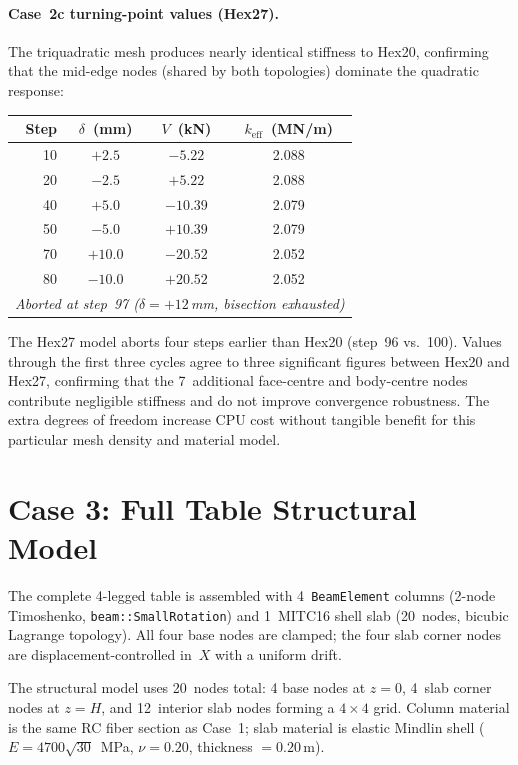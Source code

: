 \paragraph{Case~2c turning-point values (Hex27).}
The triquadratic mesh produces nearly identical stiffness to Hex20,
confirming that the mid-edge nodes (shared by both topologies)
dominate the quadratic response:

\begin{center}
\begin{tabular}{rccc}
\toprule
\textbf{Step} & $\delta$~(mm) & $V$~(kN) & $k_{\text{eff}}$~(MN/m) \\
\midrule
 10 & $+2.5$  & $-5.22$  & 2.088 \\
 20 & $-2.5$  & $+5.22$  & 2.088 \\
 40 & $+5.0$  & $-10.39$ & 2.079 \\
 50 & $-5.0$  & $+10.39$ & 2.079 \\
 70 & $+10.0$ & $-20.52$ & 2.052 \\
 80 & $-10.0$ & $+20.52$ & 2.052 \\
\multicolumn{4}{c}{\textit{Aborted at step~97
  ($\delta = +12$\,mm, bisection exhausted)}} \\
\bottomrule
\end{tabular}
\end{center}

\noindent
The Hex27 model aborts four steps earlier than Hex20 (step~96 vs.\
100).  Values through the first three cycles agree to three
significant figures between Hex20 and Hex27, confirming that the
7~additional face-centre and body-centre nodes contribute negligible
stiffness and do not improve convergence robustness.  The extra
degrees of freedom increase CPU cost without tangible benefit for
this particular mesh density and material model.


\section{Case 3: Full Table Structural Model}
\label{sec:cyclic-case3}

The complete 4-legged table is assembled with 4~\texttt{BeamElement}
columns (2-node Timoshenko, \texttt{beam::SmallRotation}) and
1~MITC16 shell slab (20~nodes, bicubic Lagrange topology).  All four
base nodes are clamped; the four slab corner nodes are
displacement-controlled in~$X$ with a uniform drift.

The structural model uses 20~nodes total: 4 base nodes at $z = 0$,
4~slab corner nodes at $z = H$, and 12~interior slab nodes forming a
$4 \times 4$ grid.  Column material is the same RC fiber section as
Case~1; slab material is elastic Mindlin shell
($E = 4700\sqrt{30}$~MPa, $\nu = 0.20$, thickness $= 0.20$\,m).

